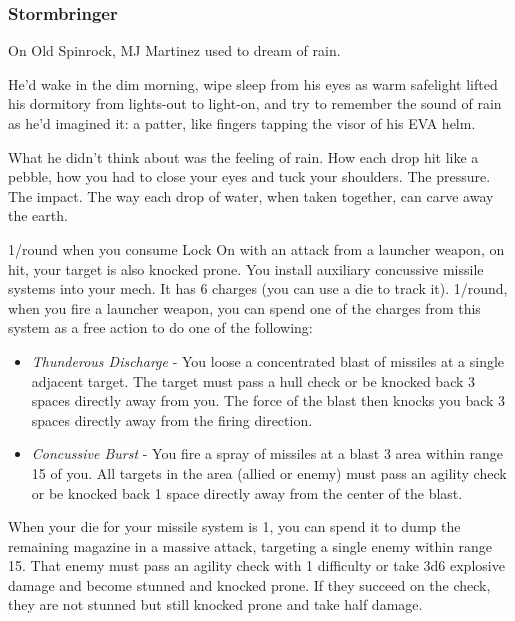 \subsubsection{Stormbringer}

\begin{talent}
{On Old Spinrock, MJ Martinez used to dream of rain.

He'd wake in the dim morning, wipe sleep from his eyes as warm safelight lifted his dormitory from lights-out to light-on, and try to remember the sound of rain as he'd imagined it: a patter, like fingers tapping the visor of his EVA helm.

What he didn't think about was the feeling of rain. How each drop hit like a pebble, how you had to close your eyes and tuck your shoulders. The pressure. The impact. The way each drop of water, when taken together, can carve away the earth.}

1/round when you consume Lock On with an attack from a launcher weapon, on hit, your target is also knocked prone. 
You install auxiliary concussive missile systems into your mech. It has 6 charges (you can use a die to track it). 1/round, when you fire a launcher weapon, you can spend one of the charges from this system as a free action to do one of the following: 
\begin{itemize}
\item \textit{Thunderous Discharge} - You loose a concentrated blast of missiles at a single adjacent target. The target must pass a hull check or be knocked back 3 spaces directly away from you. The force of the blast then knocks you back 3 spaces directly away from the firing direction. 
\item \textit{Concussive Burst} - You fire a spray of missiles at a blast 3 area within range 15 of you. All targets in the area (allied or enemy) must pass an agility check or be knocked back 1 space directly away from the center of the blast.
\end{itemize}
When your die for your missile system is 1, you can spend it to dump the remaining magazine in a massive attack, targeting a single enemy within range 15. That enemy must pass an agility check with 1 difficulty or take 3d6 explosive damage and become stunned and knocked prone. If they succeed on the check, they are not stunned but still knocked prone and take half damage.
\end{talent}
